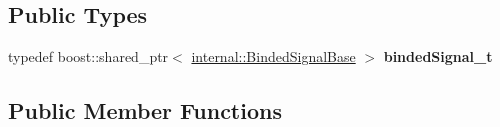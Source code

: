 \subsection*{Public Types}
\begin{DoxyCompactItemize}
\item 
\mbox{\label{classdynamic__graph_1_1RosQueuedSubscribe_a2f75c04157d429fa28dbce0e307762af}} 
typedef boost\+::shared\+\_\+ptr$<$ \hyperlink{structdynamic__graph_1_1internal_1_1BindedSignalBase}{internal\+::\+Binded\+Signal\+Base} $>$ {\bfseries binded\+Signal\+\_\+t}
\end{DoxyCompactItemize}
\subsection*{Public Member Functions}
